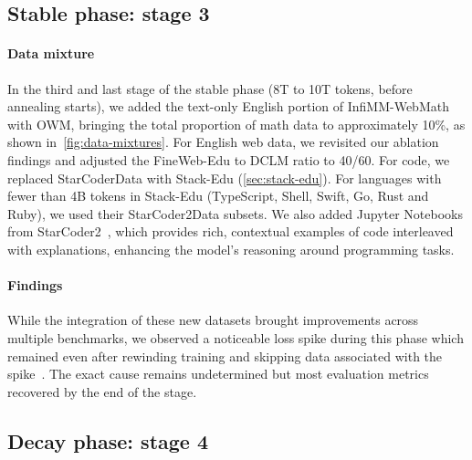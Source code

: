 \documentclass{article}
\theoremstyle{plain}
\theoremstyle{definition}
\theoremstyle{remark}
\begin{document}
\subsection{Stable phase: stage 3}
\paragraph{Data mixture}

In the third and last stage of the stable phase (8T to 10T tokens, before annealing starts), we added the text-only English portion of InfiMM-WebMath with OWM, bringing the total proportion of math data to approximately 10\%, as shown in~\cref{fig:data-mixtures}. For English web data, we revisited our ablation findings and adjusted the FineWeb-Edu to DCLM ratio to 40/60. For code, we replaced StarCoderData with Stack-Edu (\cref{sec:stack-edu}). For languages with fewer than 4B tokens in Stack-Edu (TypeScript, Shell, Swift, Go, Rust and Ruby), we used their StarCoder2Data subsets. We also added Jupyter Notebooks from StarCoder2~\cite{lozhkov2024starcoder}, which provides rich, contextual examples of code interleaved with explanations, enhancing the model's reasoning around programming tasks.

\paragraph{Findings} While the integration of these new datasets brought improvements across multiple benchmarks, we observed a noticeable loss spike during this phase which remained even after rewinding training and skipping data associated with the spike~\citep{chowdhery2023palm,almazrouei2023falcon}. The exact cause remains undetermined but most evaluation metrics recovered by the end of the stage.

\vspace{-0.15cm} 
\subsection{Decay phase: stage 4}
\vspace{-0.1cm} 
\end{document}

